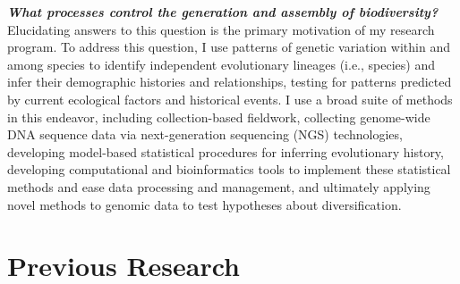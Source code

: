 \textbf{\textit{What processes control the generation and assembly of
        biodiversity?}}
Elucidating answers to this question is the primary motivation of my research
program.
To address this question, I use patterns of genetic variation within and among
species to identify independent evolutionary lineages (i.e., species) and infer
their demographic histories and relationships, testing for patterns predicted
by current ecological factors and historical events.
I use a broad suite of methods in this endeavor, including
collection-based fieldwork,
collecting genome-wide DNA sequence data via next-generation sequencing (NGS)
technologies,
developing model-based statistical procedures for inferring evolutionary
history,
developing computational and bioinformatics tools to implement these
statistical methods and ease data processing and management,
and ultimately applying novel methods to genomic data to test
hypotheses about diversification.

\section*{Previous Research}

